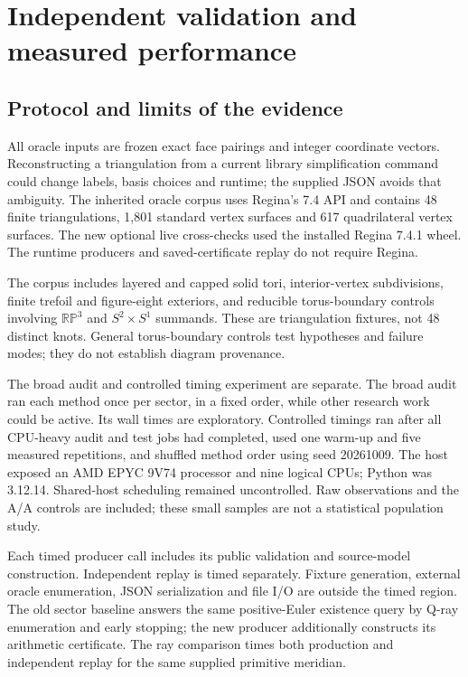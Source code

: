 \section{Independent validation and measured performance}\label{sec:experiments}

\subsection{Protocol and limits of the evidence}

All oracle inputs are frozen exact face pairings and integer coordinate vectors. Reconstructing a triangulation from a current library simplification command could change labels, basis choices and runtime; the supplied JSON avoids that ambiguity. The inherited oracle corpus uses Regina's 7.4 API and contains 48 finite triangulations, 1,801 standard vertex surfaces and 617 quadrilateral vertex surfaces. The new optional live cross-checks used the installed Regina 7.4.1 wheel. The runtime producers and saved-certificate replay do not require Regina.

The corpus includes layered and capped solid tori, interior-vertex subdivisions, finite trefoil and figure-eight exteriors, and reducible torus-boundary controls involving $\mathbb{RP}^3$ and $S^2\times S^1$ summands. These are triangulation fixtures, not 48 distinct knots. General torus-boundary controls test hypotheses and failure modes; they do not establish diagram provenance.

The broad audit and controlled timing experiment are separate. The broad audit ran each method once per sector, in a fixed order, while other research work could be active. Its wall times are exploratory. Controlled timings ran after all CPU-heavy audit and test jobs had completed, used one warm-up and five measured repetitions, and shuffled method order using seed 20261009. The host exposed an AMD EPYC 9V74 processor and nine logical CPUs; Python was 3.12.14. Shared-host scheduling remained uncontrolled. Raw observations and the A/A controls are included; these small samples are not a statistical population study.

Each timed producer call includes its public validation and source-model construction. Independent replay is timed separately. Fixture generation, external oracle enumeration, JSON serialization and file I/O are outside the timed region. The old sector baseline answers the same positive-Euler existence query by Q-ray enumeration and early stopping; the new producer additionally constructs its arithmetic certificate. The ray comparison times both production and independent replay for the same supplied primitive meridian.

